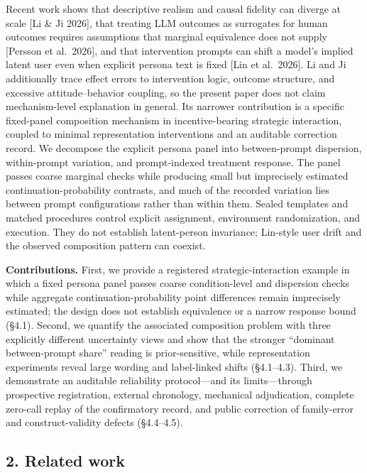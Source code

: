 \documentclass[
  11pt]{article}
\begin{document}
Recent work shows that descriptive realism and causal fidelity can
diverge at scale {[}Li \& Ji 2026{]}, that treating LLM outcomes as
surrogates for human outcomes requires assumptions that marginal
equivalence does not supply {[}Persson et al.~2026{]}, and that
intervention prompts can shift a model's implied latent user even when
explicit persona text is fixed {[}Lin et al.~2026{]}. Li and Ji
additionally trace effect errors to intervention logic, outcome
structure, and excessive attitude--behavior coupling, so the present
paper does not claim mechanism-level explanation in general. Its
narrower contribution is a specific fixed-panel composition mechanism in
incentive-bearing strategic interaction, coupled to minimal
representation interventions and an auditable correction record. We
decompose the explicit persona panel into between-prompt dispersion,
within-prompt variation, and prompt-indexed treatment response. The
panel passes coarse marginal checks while producing small but
imprecisely estimated continuation-probability contrasts, and much of
the recorded variation lies between prompt configurations rather than
within them. Sealed templates and matched procedures control explicit
assignment, environment randomization, and execution. They do not
establish latent-person invariance; Lin-style user drift and the
observed composition pattern can coexist.

\textbf{Contributions.} First, we provide a registered
strategic-interaction example in which a fixed persona panel passes
coarse condition-level and dispersion checks while aggregate
continuation-probability point differences remain imprecisely estimated;
the design does not establish equivalence or a narrow response bound
(§4.1). Second, we quantify the associated composition problem with
three explicitly different uncertainty views and show that the stronger
``dominant between-prompt share'' reading is prior-sensitive, while
representation experiments reveal large wording and label-linked shifts
(§4.1--4.3). Third, we demonstrate an auditable reliability
protocol---and its limits---through prospective registration, external
chronology, mechanical adjudication, complete zero-call replay of the
confirmatory record, and public correction of family-error and
construct-validity defects (§4.4--4.5).

\subsection{2. Related work}\label{related-work}
\end{document}
